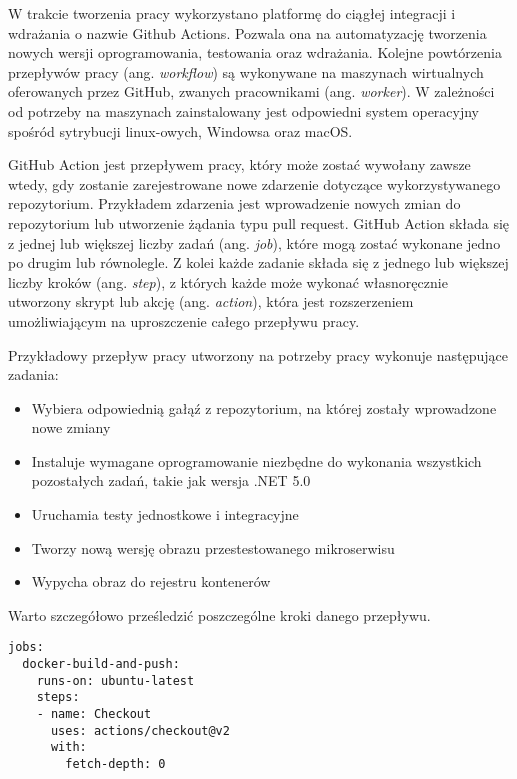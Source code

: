 W trakcie tworzenia pracy wykorzystano platformę do ciągłej integracji i wdrażania 
o nazwie Github Actions. Pozwala ona na automatyzację tworzenia nowych wersji 
oprogramowania, testowania oraz wdrażania. Kolejne powtórzenia przepływów pracy 
(ang. \textit{workflow}) są wykonywane na maszynach wirtualnych oferowanych przez 
GitHub, zwanych pracownikami (ang. \textit{worker}). W zależności od potrzeby na maszynach 
zainstalowany jest odpowiedni system operacyjny spośród sytrybucji 
linux-owych, Windowsa oraz macOS.

GitHub Action jest przepływem pracy, który może zostać wywołany zawsze wtedy, gdy 
zostanie zarejestrowane nowe zdarzenie dotyczące wykorzystywanego repozytorium. 
Przykładem zdarzenia jest wprowadzenie nowych zmian do repozytorium lub utworzenie 
żądania typu pull request. GitHub Action składa się z jednej lub większej liczby 
zadań (ang. \textit{job}), które mogą zostać wykonane jedno po drugim lub równolegle. Z kolei 
każde zadanie składa się z jednego lub większej liczby kroków (ang. \textit{step}), z których 
każde może wykonać własnoręcznie utworzony skrypt lub akcję (ang. \textit{action}), która jest 
rozszerzeniem umożliwiającym na uproszczenie całego przepływu pracy.

Przykładowy przepływ pracy utworzony na potrzeby pracy wykonuje następujące zadania:

\begin{itemize} %
    \item Wybiera odpowiednią gałąź z repozytorium, na której zostały wprowadzone 
    nowe zmiany
    \item Instaluje wymagane oprogramowanie niezbędne do wykonania wszystkich 
    pozostałych zadań, takie jak wersja .NET 5.0
    \item Uruchamia testy jednostkowe i integracyjne
    \item Tworzy nową wersję obrazu przestestowanego mikroserwisu
    \item Wypycha obraz do rejestru kontenerów
\end{itemize}

Warto szczegółowo prześledzić poszczególne kroki danego przepływu.

\begin{lstlisting}
jobs:
  docker-build-and-push:
    runs-on: ubuntu-latest
    steps:
    - name: Checkout
      uses: actions/checkout@v2
      with:
        fetch-depth: 0
\end{lstlisting}

